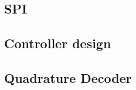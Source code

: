 \documentclass[../../main]{subfiles}
\begin{document}
\subsection{SPI}%
\label{sub:spi}



\subsection{Controller design}%
\label{sec:controller_design}





\subsection{Quadrature Decoder}%
\label{sub:quadraturdecoder}

\end{document}
